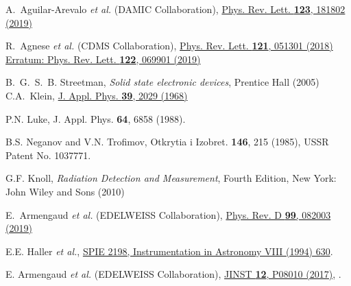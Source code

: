 \begin{thebibliography}{100}
A.~Aguilar-Arevalo {\it et al.} (DAMIC Collaboration),
\href{\DOI/10.1103/PhysRevLett.123.181802}{Phys. Rev. Lett. {\bf 123}, 181802 (2019)} 

 R.~Agnese {\it et al.} (CDMS Collaboration),
 \href{\DOI/10.1103/PhysRevLett.121.051301} {Phys. Rev. Lett. {\bf 121}, 051301 (2018)} 
\href{\DOI/10.1103/PhysRevLett.122.069901} {Erratum: Phys. Rev. Lett. {\bf 122}, 069901 (2019)} 

B.~G.~S.~B. Streetman, {\it Solid state electronic devices}, Prentice Hall (2005)
C.A.~Klein,
\href{\DOI/10.1063/1.1656484}{J. Appl. Phys. {\bf 39}, 2029 (1968)} 

P.N. Luke, J. Appl. Phys. {\bf 64}, 6858 (1988).

B.S. Neganov and V.N. Trofimov, 
Otkrytia i Izobret. {\bf 146}, 215 (1985), 
USSR Patent No. 1037771.


   G.F. Knoll,
   {\it Radiation Detection and Measurement}, Fourth Edition, New York: John Wiley and Sons (2010)


E.~Armengaud {\it et al.} (EDELWEISS Collaboration),
\href{\DOI/10.1103/PhysRevD.99.082003}{Phys. Rev. D {\bf 99}, 082003 (2019)} 

E.E. Haller {\it et al.}, \href{\DOI/10.1117/12.176771}{SPIE 2198, Instrumentation in Astronomy VIII (1994) 630}.

E. Armengaud {\it et al.} (EDELWEISS Collaboration), 
\href{\DOI/10.1088/1748-0221/12/08/P08010}{JINST {\bf 12}, P08010 (2017)}, .


   


\end{thebibliography}
